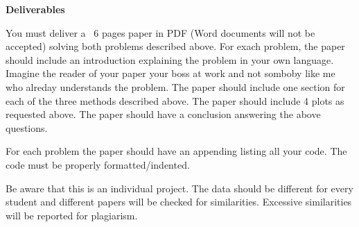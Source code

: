 \documentclass[12pt]{article}
\begin{document}
{\bf Deliverables}

You must deliver a ~6 pages paper in PDF (Word documents will not be accepted) solving both problems described above. For exach problem, the paper should include an introduction explaining the problem in your own language. Imagine the reader of your paper your boss at work and not somboby like me who alreday understands the problem. The paper should include one section for each of the three methods described above. The paper should include 4 plots as requested above. The paper should have a conclusion answering the above questions.

For each problem the paper should have an appending listing all your code. The code must be properly formatted/indented.

Be aware that this is an individual project. The data should be different for every student and different papers will be checked for similarities. Excessive similarities will be reported for plagiarism.
\end{document}
